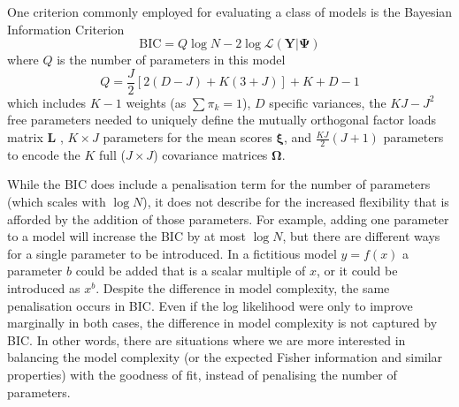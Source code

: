 \documentclass[twocolumn]{aastex62}
\newcommand{\vect}[1]{\boldsymbol{\mathbf{#1}}}
\renewcommand{\vec}[1]{\vect{#1}}
\newcommand{\weight}{\pi}
\newcommand{\data}{\textbf{Y}}
\newcommand{\factorloads}{\textbf{L}}
\newcommand{\scoremeans}{\vec\xi}
\newcommand{\scorecovs}{\vec\Omega}
\newcommand{\NumDimensions}{D}
\newcommand{\NumLatentFactors}{J}
\newcommand{\NumComponents}{K}
\newcommand{\numcomponents}{k}
\begin{document}
One criterion commonly employed for evaluating a class of models is the 
Bayesian Information Criterion \citep[BIC;][]{Schwarz:1978}
\begin{equation}
	\textrm{BIC} = Q\log{N} - 2\log\mathcal{L}\left(\data|\vec\Psi\right)
	 \label{eq:bic}
\end{equation} 
\noindent{}where $Q$ is the number of parameters in this model
\begin{equation}
	Q = \frac{\NumLatentFactors}{2}\left[2\left(\NumDimensions - \NumLatentFactors\right) + \NumComponents\left(3 + \NumLatentFactors\right)\right] + \NumComponents + \NumDimensions - 1
\end{equation}
\noindent{}which includes $\NumComponents - 1$ weights (as $\sum\weight_\numcomponents = 1$), $\NumDimensions$ specific variances, the $\NumComponents\NumLatentFactors - \NumLatentFactors^2$ free parameters needed to uniquely define the mutually orthogonal factor loads matrix $\factorloads$ \citep{Baek:2010}, $\NumComponents \times \NumLatentFactors$ parameters for the mean scores $\scoremeans$, and $\frac{\NumComponents\NumLatentFactors}{2}\left(\NumLatentFactors + 1\right)$ parameters to encode the $\NumComponents$ full ($\NumLatentFactors \times \NumLatentFactors$) covariance matrices $\scorecovs$.

While the BIC does include a penalisation term for the number of
parameters (which scales with $\log{N}$), it does not describe for the
increased flexibility that is afforded by the addition of those parameters.
For example, adding one parameter
to a model will increase the BIC by at most $\log{N}$, but there are different
ways for a single parameter to be introduced. In a fictitious model $y=f(x)$
a parameter $b$ could be added that is a scalar multiple of $x$, or it could be
introduced as $x^b$. Despite the difference in model complexity, the same
penalisation occurs in BIC. Even if the log likelihood were only to improve
marginally in both cases, the difference in model complexity is not captured
by BIC. In other words, there are situations where we are more interested in
balancing the model complexity (or the expected Fisher information and similar
properties) with the goodness of fit, instead of penalising the number of 
parameters.
\end{document}
